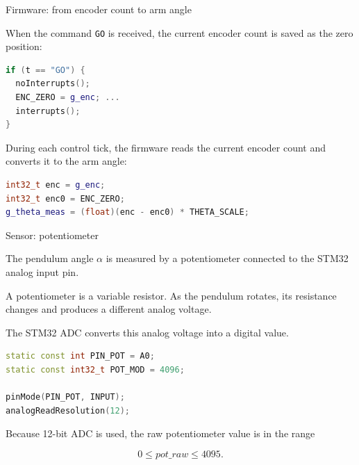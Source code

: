 \documentclass[aspectratio=169]{beamer}
\begin{document}
\begin{frame}[fragile]{Firmware: from encoder count to arm angle}

When the command \texttt{GO} is received, the current encoder count is saved as the zero position:

\begin{lstlisting}[language=C++]
if (t == "GO") {
  noInterrupts();
  ENC_ZERO = g_enc; ...
  interrupts();
}
\end{lstlisting}

\vspace{0.15cm}
During each control tick, the firmware reads the current encoder count and converts it to the arm angle:

\begin{lstlisting}[language=C++]
int32_t enc = g_enc;
int32_t enc0 = ENC_ZERO;
g_theta_meas = (float)(enc - enc0) * THETA_SCALE;
\end{lstlisting}


\end{frame}


\begin{frame}[fragile]{Sensor: potentiometer}

The pendulum angle $\alpha$ is measured by a potentiometer connected to the STM32 analog input pin.

\vspace{0.2cm}

A potentiometer is a variable resistor. As the pendulum rotates, its resistance changes and produces a different analog voltage.

\vspace{0.2cm}

The STM32 ADC converts this analog voltage into a digital value.

\begin{lstlisting}[language=C++]
static const int PIN_POT = A0;
static const int32_t POT_MOD = 4096;

pinMode(PIN_POT, INPUT);
analogReadResolution(12);
\end{lstlisting}

\vspace{0.15cm}

Because 12-bit ADC is used, the raw potentiometer value is in the range

\[
0 \leq pot\_raw \leq 4095 .
\]

\end{frame}
\end{document}
